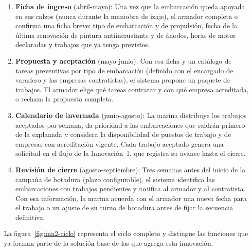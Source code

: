 \begin{enumerate}
  \item \textbf{Ficha de ingreso} (abril-mayo): Una vez que la embarcación
        queda apoyada en sus calzos (nunca durante la maniobra de izaje), el
        armador completa o confirma una ficha breve: tipo de embarcación y de
        propulsión, fecha de la última renovación de pintura antiincrustante y
        de ánodos, horas de motor declaradas y trabajos que ya tenga previstos.
  \item \textbf{Propuesta y aceptación} (mayo-junio): Con esa ficha y un
        catálogo de tareas preventivas por tipo de embarcación (definido con el
        encargado de varadero y las empresas contratistas), el sistema propone
        un paquete de trabajos. El armador elige qué tareas contratar y con qué
        empresa acreditada, o rechaza la propuesta completa.
  \item \textbf{Calendario de invernada} (junio-agosto): La marina distribuye
        los trabajos aceptados por semana, da prioridad a las embarcaciones que
        saldrán primero de la explanada y considera la disponibilidad de
        puestos de trabajo y de empresas con acreditación vigente. Cada trabajo
        aceptado genera una solicitud en el flujo de la Innovación~1, que
        registra su avance hasta el cierre.
  \item \textbf{Revisión de cierre} (agosto-septiembre): Tres semanas antes
        del inicio de la campaña de botadura (plazo configurable), el
        sistema identifica las embarcaciones con trabajos pendientes y notifica
        al armador y al contratista. Con esa información, la marina acuerda con
        el armador una nueva fecha para el trabajo o un ajuste de su turno de
        botadura antes de fijar la secuencia definitiva.
\end{enumerate}

La figura~\ref{fig:inn2-ciclo} representa el ciclo completo y distingue las
funciones que ya forman parte de la solución base de las que agrega esta
innovación.

